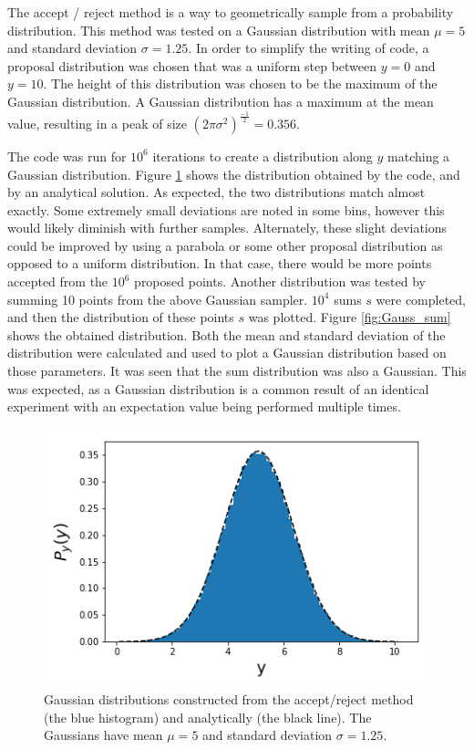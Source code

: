 \documentclass[twocolumn]{article}
\begin{document}
The accept / reject method is a way to geometrically sample from a probability distribution. This method was tested on a Gaussian distribution with mean $\mu=5$ and standard deviation $\sigma=1.25$. In order to simplify the writing of code, a proposal distribution was chosen that was a uniform step between $y=0$ and $y=10$. The height of this distribution was chosen to be the maximum of the Gaussian distribution. A Gaussian distribution has a maximum at the mean value, resulting in a peak of size $(2 \pi \sigma^2)^{\frac{-1}{2}} = 0.356$. 

The code was run for $10^6$ iterations to create a distribution along $y$ matching a Gaussian distribution. Figure \ref{fig:Gauss_Dist} shows the distribution obtained by the code, and by an analytical solution. As expected, the two distributions match almost exactly. Some extremely small deviations are noted in some bins, however this would likely diminish with further samples. Alternately, these slight deviations could be improved by using a parabola or some other proposal distribution as opposed to a uniform distribution. In that case, there would be more points accepted from the $10^6$ proposed points. Another distribution was tested by summing 10 points from the above Gaussian sampler. $10^4$ sums $s$ were completed, and then the distribution of these points $s$ was plotted. Figure \ref{fig:Gauss_sum} shows the obtained distribution. Both the mean and standard deviation of the distribution were calculated and used to plot a Gaussian distribution based on those parameters. It was seen that the sum distribution was also a Gaussian. This was expected, as a Gaussian distribution is a common result of an identical experiment with an expectation value being performed multiple times.

\begin{figure}
\centering
\includegraphics[width=\linewidth]{../Assn1/Gauss_Dist}
\caption{Gaussian distributions constructed from the accept/reject method (the blue histogram) and analytically (the black line). The Gaussians have mean $\mu=5$ and standard deviation $\sigma=1.25$.}
\label{fig:Gauss_Dist}
\end{figure}
\end{document}
